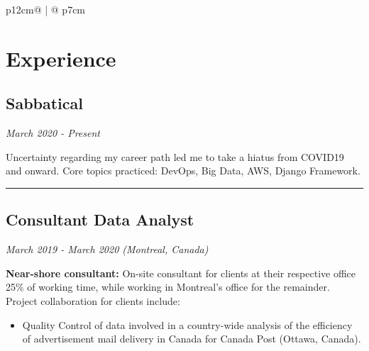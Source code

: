 \documentclass[letterpaper, 11pt]{article}
\begin{document}
\begin{tabular}{p{12cm}@{\hspace{1em}} | @{\hspace{1em}} p{7cm}}
    \section*{Experience}

        \subsection*{Sabbatical}
            \hspace{2em} \textit{March 2020 - Present}
            \vspace{0.5em}
            \begin{adjustwidth}{1em}{1em}
                Uncertainty regarding my career path led me to take a hiatus from COVID19 and onward. Core topics practiced: DevOps, Big Data, AWS, Django Framework.
            
                {\color{lightgray}\rule{\linewidth}{1pt}}
            \end{adjustwidth}
            
        \subsection*{Consultant Data Analyst}
            
            \hspace{1em}{\large IBM Client Innovation Center}
            
            \hspace{2em}\textit{March 2019 - March 2020  (Montreal, Canada)}

            \vspace{0.5em}

            \begin{adjustwidth}{1em}{1em}
                \textbf{Near-shore consultant:} On-site consultant for clients at their respective office 25\% of working time, while working in Montreal's office for the remainder. Project collaboration for clients include:

                \begin{itemize}
                    \item Quality Control of data involved in a country-wide analysis of the efficiency of advertisement mail delivery in Canada for Canada Post (Ottawa, Canada).


\end{itemize}
\end{adjustwidth}
\end{tabular}
\end{document}
